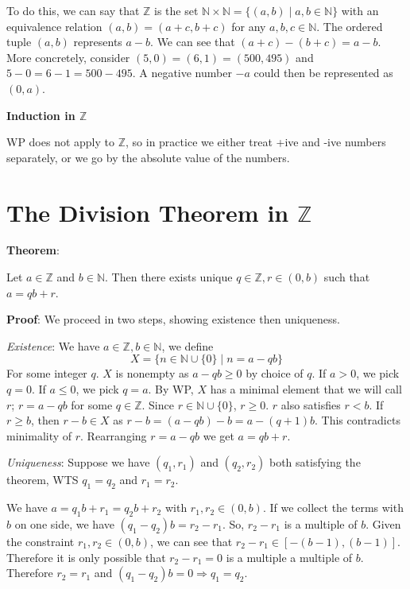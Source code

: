 \documentclass{article}
\begin{document}
\begin{multicols*}{2}
To do this, we can say that $\mathbb{Z}$ is the set $\mathbb{N} \times \mathbb{N} = \{(a, b) \;|\; a, b \in \mathbb{N}\}$ with an equivalence relation $(a, b) = (a+c, b+c)$ for any $a, b, c \in \mathbb{N}$. The ordered tuple $(a, b)$ represents $a - b$. We can see that $(a + c) - (b + c) = a - b$. More concretely, consider $(5, 0) = (6, 1) = (500, 495)$ and $5 - 0 = 6 - 1 = 500-495$. A negative number $-a$ could then be represented as $(0, a)$.

\textbf{Induction in $\mathbb{Z}$}

WP does not apply to $\mathbb{Z}$, so in practice we either treat +ive and -ive numbers separately, or we go by the absolute value of the numbers.

\section{The Division Theorem in $\mathbb{Z}$}

\textbf{Theorem}:

Let $a \in \mathbb{Z}$ and $b \in \mathbb{N}$. Then there exists unique $q \in \mathbb{Z}, r \in (0, b)$ such that $a = qb + r$.

\textbf{Proof}: We proceed in two steps, showing existence then uniqueness.

\textit{Existence}: We have $a \in \mathbb{Z}, b \in \mathbb{N}$, we define \[X = \{ n \in \mathbb{N} \cup \{0\} \;|\; n = a - qb\}\] For some integer $q$. $X$ is nonempty as $a - qb \geq 0$ by choice of $q$. If $a > 0$, we pick $q = 0$. If $a \leq 0$, we pick $q = a$. By WP, $X$ has a minimal element that we will call $r$; $r = a - qb$ for some $q \in \mathbb{Z}$. Since $r \in \mathbb{N} \cup \{0\}$, $r \geq 0$. $r$ also satisfies $r < b$. If $r \geq b$, then $r - b \in X$ as $r - b = (a - qb) - b = a - (q+1)b$. This contradicts minimality of $r$. Rearranging $r = a - qb$ we get $a = qb + r$.

\textit{Uniqueness}: Suppose we have $(q_1, r_1)$ and $(q_2, r_2)$ both satisfying the theorem, WTS $q_1 = q_2$ and $r_1 = r_2$.

We have $a = q_1b + r_1 = q_2b + r_2$ with $r_1, r_2 \in (0, b)$. If we collect the terms with $b$ on one side, we have $(q_1 - q_2)b = r_2 - r_1$. So, $r_2 - r_1$ is a multiple of $b$. Given the constraint $r_1, r_2 \in (0, b)$, we can see that $r_2 - r_1 \in [-(b-1),(b-1)]$. Therefore it is only possible that $r_2 - r_1 = 0$ is a multiple a multiple of $b$. Therefore $r_2 = r_1$ and $(q_1 - q_2)b = 0 \Rightarrow q_1 = q_2$.


\end{multicols*}
\end{document}
